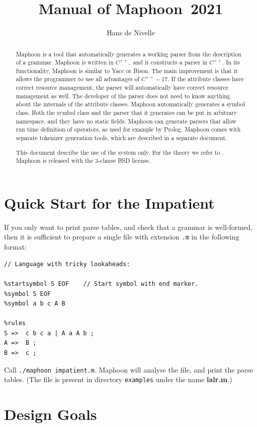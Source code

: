 \documentclass{article}
\title{Manual of Maphoon~2021}
\author{Hans de Nivelle}
\begin{document}
\maketitle
\begin{abstract}
   \noindent
   Maphoon is a tool that automatically generates a 
   working parser from the description of a grammar. 
   Maphoon is written in $ C^{++}, $ and it constructs a parser 
   in $ C^{++}. $ 
   In its functionality, Maphoon is similar to Yacc or Bison.
   The main improvement is that it allows the programmer to 
   use all advantages of $ C^{++}-17. $ If the attribute classes
   have correct resource management, the parser will automatically
   have correct resource management as well. 
   The developer of the parser does not need to know
   anything about the internals of the attribute classes. 
   Maphoon automatically generates a symbol class.  
   Both the symbol class and the parser that it generates can be 
   put in arbitrary namespace, and they have no static fields.
   Maphoon can generate parsers that allow run time definition of operators,
   as used for example by Prolog.
   Maphoon comes with separate tokenizer generation tools, 
   which are described in a separate document.

   \noindent
   This document describe the use of the system only. For the theory we
   refer to \cite{Dragon2007}.
   Maphoon is released with the 3-clause BSD license.
\end{abstract}

\section{Quick Start for the Impatient}

If you only want to print parse tables, and check that a grammar
is well-formed, then it is sufficient to prepare a single
file with extension \verb+.m+ in the following format: 
\begin{verbatim} 
// Language with tricky lookaheads:

%startsymbol S EOF    // Start symbol with end marker. 
%symbol S EOF
%symbol a b c A B

%rules
S =>  c b c a | A a A b ;
A =>  B ;
B =>  c ;  \end{verbatim}
Call \verb+./maphoon impatient.m+. 
Maphoon will analyse the file, and print the parse tables. 
(The file is present in directory \verb|examples| under the name
{\bf lalr.m}.) 

\section{Design Goals}
\end{document}
